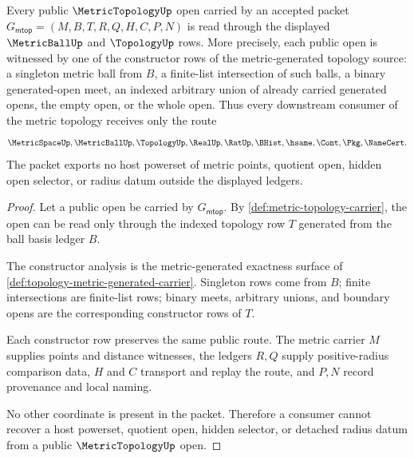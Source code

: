 \begin{theorem}
\label{thm:metric-topology-ball-basis-scope}
Every public $\MetricTopologyUp$ open carried by an accepted packet $G_{\mathsf{mtop}}=(M,B,T,R,Q,H,C,P,N)$ is read through the displayed $\MetricBallUp$ and $\TopologyUp$ rows. More precisely, each public open is witnessed by one of the constructor rows of the metric-generated topology source: a singleton metric ball from $B$, a finite-list intersection of such balls, a binary generated-open meet, an indexed arbitrary union of already carried generated opens, the empty open, or the whole open. Thus every downstream consumer of the metric topology receives only the route
$$
\MetricSpaceUp,\MetricBallUp,\TopologyUp,\RealUp,\RatUp,\BHist,\hsame,\Cont,\Pkg,\NameCert .
$$
The packet exports no host powerset of metric points, quotient open, hidden open selector, or radius datum outside the displayed ledgers.
\end{theorem}
\begin{proof}
Let a public open be carried by $G_{\mathsf{mtop}}$. By \autoref{def:metric-topology-carrier}, the open can be read only through the indexed topology row $T$ generated from the ball basis ledger $B$.

The constructor analysis is the metric-generated exactness surface of \autoref{def:topology-metric-generated-carrier}. Singleton rows come from $B$; finite intersections are finite-list rows; binary meets, arbitrary unions, and boundary opens are the corresponding constructor rows of $T$.

Each constructor row preserves the same public route. The metric carrier $M$ supplies points and distance witnesses, the ledgers $R,Q$ supply positive-radius comparison data, $H$ and $C$ transport and replay the route, and $P,N$ record provenance and local naming.

No other coordinate is present in the packet. Therefore a consumer cannot recover a host powerset, quotient open, hidden selector, or detached radius datum from a public $\MetricTopologyUp$ open.
\end{proof}

